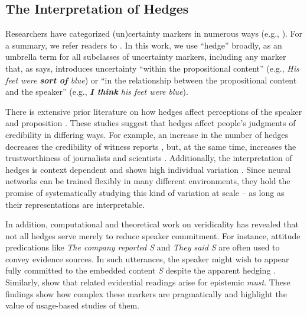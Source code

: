 \documentclass[11pt,a4paper]{article}
\newcommand{\word}[1]{\emph{#1}}
\begin{document}
\subsection{The Interpretation of Hedges}

Researchers have categorized (un)certainty markers in numerous ways (e.g., \citealt{lakoff1972hedges, prince1982hedging, brown1987politeness}). For a summary, we refer readers to \citealt{fraser2010pragmatic}. 
In this work, we use ``hedge'' broadly, as an umbrella term for all subclasses of uncertainty markers, including any marker that, as \citet{prince1982hedging} says, introduces uncertainty ``within the propositional content'' (e.g., \word{His feet were \textbf{sort of} blue}) or ``in the relationship between the propositional content and the speaker'' (e.g., \word{\textbf{I think} his feet were blue}).

There is extensive prior literature on how hedges affect perceptions of the speaker and proposition \citep{Erickson-etal:1978, durik2008effects, bonnefon2006tactful, rubin:2007:ShortPapers, jensen2008scientific, ferson2015natural}.
These studies suggest that hedges affect people's judgments of credibility in differing ways. For example, an increase in the number of hedges decreases the credibility of witness reports \citep{Erickson-etal:1978}, but, at the same time, increases the trustworthiness of journalists and scientists \citep{jensen2008scientific}. Additionally, the interpretation of hedges is context dependent \citep{bonnefon2006tactful,durik2008effects,ferson2015natural} and shows high individual variation \citep{rubin:2007:ShortPapers,ferson2015natural}. 
Since neural networks can be trained flexibly in many different environments, they hold the promise of systematically studying this kind of variation at scale -- as long as their representations are interpretable.

In addition, computational and theoretical work on veridicality has revealed that not all hedges serve merely to reduce speaker commitment. For instance, attitude predications like \word{The company reported S} and \word{They said S} are often used to convey evidence sources. In such utterances, the speaker might wish to appear fully committed to the embedded content \word{S} despite the apparent hedging \citep{Simons07,deMarneffe:Manning:Potts:2012,White:Rawlins:2018,White-etal:2018}. Similarly, \citet{vonFintel:Gillies:2010} show that related evidential readings arise for epistemic \word{must}. These findings show how complex these markers are pragmatically and highlight the value of usage-based studies of them.
\end{document}
